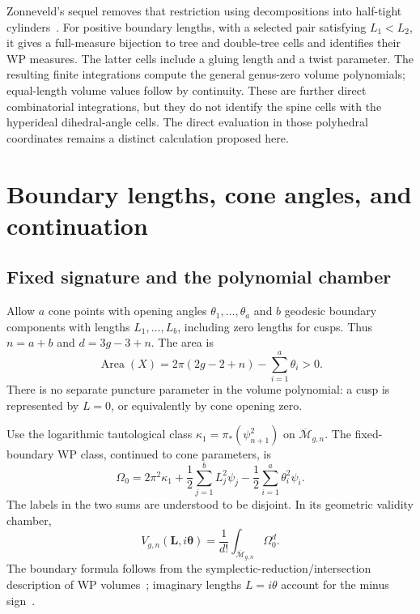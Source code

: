 \documentclass[11pt,a4paper]{article}
\numberwithin{equation}{section}
\theoremstyle{definition}
\theoremstyle{remark}
\newcommand{\MM}{\overline{\mathcal M}}
\newcommand{\angles}{\boldsymbol\theta}
\newcommand{\lengths}{\mathbf L}
\begin{document}
Zonneveld's sequel removes that restriction using decompositions into
half-tight cylinders~\cite[Theorem 3]{Zonneveld}. For positive boundary
lengths, with a selected pair satisfying $L_1<L_2$, it gives a full-measure
bijection to tree and double-tree cells and identifies their WP measures.
The latter cells include a gluing length and a twist parameter. The resulting
finite integrations compute the general genus-zero volume polynomials;
equal-length volume values follow by continuity. These are further direct
combinatorial integrations, but they do not identify the spine cells with
the hyperideal dihedral-angle cells. The direct evaluation in those
polyhedral coordinates remains a distinct calculation proposed here.

\section{Boundary lengths, cone angles, and continuation}
\label{sec:cones}

\subsection{Fixed signature and the polynomial chamber}

Allow $a$ cone points with opening angles $\theta_1,\ldots,\theta_a$ and
$b$ geodesic boundary components with lengths $L_1,\ldots,L_b$, including
zero lengths for cusps. Thus $n=a+b$ and $d=3g-3+n$. The area is
\begin{equation}
 \operatorname{Area}(X)=2\pi(2g-2+n)-\sum_{i=1}^{a}\theta_i>0.
 \label{eq:gb}
\end{equation}
There is no separate puncture parameter in the volume polynomial: a cusp
is represented by $L=0$, or equivalently by cone opening zero.

Use the logarithmic tautological class
$\kappa_1=\pi_*(\psi_{n+1}^2)$ on $\MM_{g,n}$. The fixed-boundary WP class,
continued to cone parameters, is
\begin{equation}
 \Omega_0=2\pi^2\kappa_1+\frac12\sum_{j=1}^{b}L_j^2\psi_j
                          -\frac12\sum_{i=1}^{a}\theta_i^2\psi_i.
 \label{eq:wpclass}
\end{equation}
The labels in the two sums are understood to be disjoint. In its geometric
validity chamber,
\begin{equation}
 V_{g,n}(\lengths,i\angles)=\frac1{d!}
                          \int_{\MM_{g,n}}\Omega_0^d.
 \label{eq:intersectionvolume}
\end{equation}
The boundary formula follows from the symplectic-reduction/intersection
description of WP volumes~\cite{MirzIntersection}; imaginary lengths
$L=i\theta$ account for the minus sign~\cite{DoNorbury}.
\end{document}
